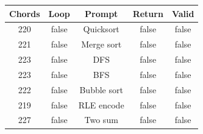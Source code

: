 \begin{table}[h]
\centering
\begin{tabular}{ |c|c|c|c|c| }
\hline
Chords & Loop & Prompt & Return & Valid \\
\hline
220 & false & Quicksort & false & false \\
\hline
221 & false & Merge sort & false & false \\
\hline
223 & false & DFS & false & false \\
\hline
223 & false & BFS & false & false \\
\hline
222 & false & Bubble sort & false & false \\
\hline
219 & false & RLE encode & false & false \\
\hline
227 & false & Two sum & false & false \\
\hline
\end{tabular}
\end{table}
